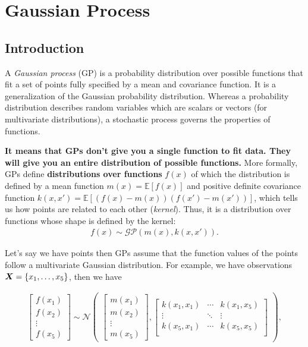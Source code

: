 \chapter{Gaussian Process}

\section{Introduction}
\label{sec:gaussian_process}
A \textit{Gaussian process} (GP) is a probability distribution over possible functions that fit a set of points fully specified by a mean and covariance function. It is a generalization of the Gaussian probability distribution. Whereas a probability distribution describes random variables which are scalars or vectors (for multivariate distributions), a stochastic process governs the properties of functions.


\textbf{It means that GPs don't give you a single function to fit data. They will give you an entire distribution of possible functions.} More formally, GPs define \textbf{distributions over functions} $f(x)$ of which the distribution is defined by a mean function $m(x)=\mathbb{E}[f(x)]$ and positive definite covariance function $k(x,x')=\mathbb{E}[(f(x)-m(x))(f(x')-m(x'))]$, which tells us how points are related to each other (\ie \textit{kernel}). Thus, it is a distribution over functions whose shape is defined by the kernel:
\begin{align*}
	f(x) \sim \mathcal{GP}(m(x),k(x,x')).
\end{align*}

Let's say we have points then GPs assume that the function values of the points follow a multivariate Gaussian distribution. For example, we have observations ${\bm{X}}=\{x_1, \dots, x_5\}$, then we have

\begin{align*}
	\begin{bmatrix}
		f(x_1)\\
		f(x_2)\\
		\vdots \\
		f(x_5)
	\end{bmatrix}\sim \mathcal{N}
	\begin{pmatrix}
	\begin{bmatrix}
		m(x_1)\\
		m(x_2)\\
		\vdots\\
		m(x_5)
	\end{bmatrix},
	\begin{bmatrix}
		k(x_1,x_1)& \cdots& k(x_1,x_5)\\
		\vdots& \ddots& \vdots\\
		k(x_5,x_1)& \cdots& k(x_5,x_5)\\
	\end{bmatrix}
	\end{pmatrix},
\end{align*}

